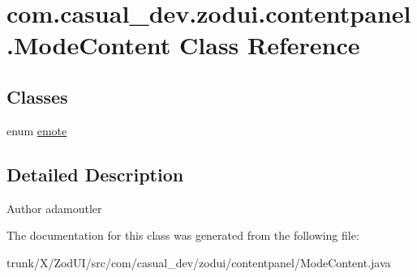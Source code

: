 \hypertarget{classcom_1_1casual__dev_1_1zodui_1_1contentpanel_1_1_mode_content}{\section{com.\-casual\-\_\-dev.\-zodui.\-contentpanel.\-Mode\-Content Class Reference}
\label{classcom_1_1casual__dev_1_1zodui_1_1contentpanel_1_1_mode_content}
}
\subsection*{Classes}
\begin{DoxyCompactItemize}
\item 
enum \hyperlink{enumcom_1_1casual__dev_1_1zodui_1_1contentpanel_1_1_mode_content_1_1emote}{emote}
\end{DoxyCompactItemize}


\subsection{Detailed Description}
\begin{DoxyAuthor}{Author}
adamoutler 
\end{DoxyAuthor}


The documentation for this class was generated from the following file\-:\begin{DoxyCompactItemize}
\item 
trunk/\-X/\-Zod\-U\-I/src/com/casual\-\_\-dev/zodui/contentpanel/Mode\-Content.\-java\end{DoxyCompactItemize}
